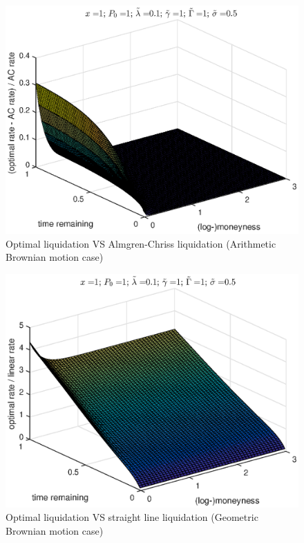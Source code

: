 \documentclass[11pt]{article}
\theoremstyle{definition}
\theoremstyle{remark}
\begin{document}
\begin{figure}
\includegraphics[]{ABM_AC.eps}
\caption{Optimal liquidation VS Almgren-Chriss liquidation (Arithmetic Brownian motion case)}
\label{fig:ABM_lin}
\end{figure}

\begin{figure}
\includegraphics[]{GBM_lin.eps}
\caption{Optimal liquidation VS straight line liquidation (Geometric Brownian motion case)}
\label{fig:ABM_lin}
\end{figure}
\end{document}
